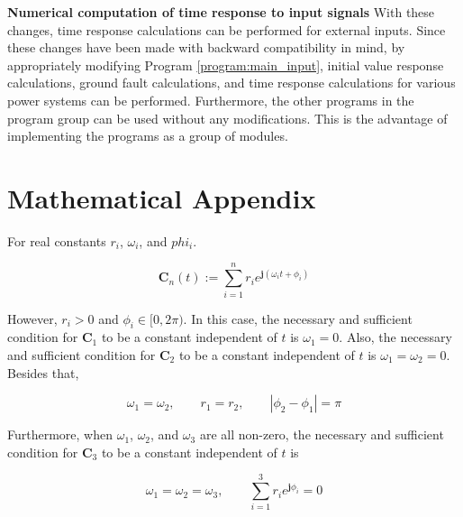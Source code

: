 \documentclass[graybox, envcountchap]{svmult}
\begin{document}
\begin{example}{\textbf{Numerical computation of time response to input signals}}
With these changes, time response calculations can be performed for external
inputs. Since these changes have been made with backward compatibility in mind,
by appropriately modifying Program \ref{program:main_input}, initial value
response calculations, ground fault calculations, and time response calculations
for various power systems can be performed. Furthermore, the other programs in
the program group can be used without any modifications. This is the advantage
of implementing the programs as a group of modules.
\end{example}


\section*{Mathematical Appendix}
\begin{lemma}\label{lem:sumc}

For real constants $r_i$, $\omega_i$, and $phi_i$.

\begin{equation*}
  \bm{C}_n(t) := 
  \sum_{i=1}^n r_i e^{ \bm{j} (\omega_i t + \phi_i)}
\end{equation*}

However, $r_i>0$ and $\phi_i \in [0,2\pi)$. In this case, the necessary and
sufficient condition for $\bm{C}_1$ to be a constant independent of $t$ is
$\omega_1=0$. Also, the necessary and sufficient condition for $\bm{C}_2$ to be
a constant independent of $t$ is $\omega_1=\omega_2=0$.  Besides that,

\begin{equation*}
  \omega_1=\omega_2
  ,\qquad
  r_1=r_2
  ,\qquad
  |\phi_2-\phi_1| = \pi
\end{equation*}

Furthermore, when $\omega_1$, $\omega_2$, and $\omega_3$ are all non-zero, the
necessary and sufficient condition for $\bm{C}_3$ to be a constant independent
of $t$ is

\begin{equation*}
  \omega_1=\omega_2=\omega_3
  ,\qquad
  \sum_{i=1}^3 r_i e^{\bm{j}\phi_i}=0
\end{equation*}
\end{lemma}
\end{document}
